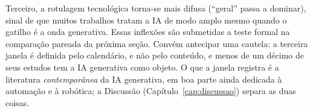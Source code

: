 Terceiro, a rotulagem tecnológica torna-se mais difusa (``geral'' passa a dominar), sinal de que muitos trabalhos tratam a IA de modo amplo mesmo quando o gatilho é a onda generativa. Essas inflexões são submetidas a teste formal na comparação pareada da próxima seção. Convém antecipar uma cautela: a terceira janela é definida pelo calendário, e não pelo conteúdo, e menos de um décimo de seus estudos tem a IA generativa como objeto. O que a janela registra é a literatura \emph{contemporânea} da IA generativa, em boa parte ainda dedicada à automação e à robótica; a Discussão (Capítulo~\ref{cap:discussao}) separa as duas coisas.
